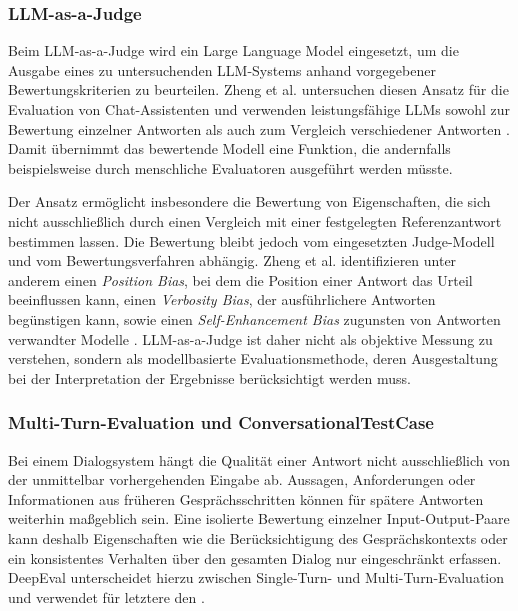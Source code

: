 \subsubsection{LLM-as-a-Judge}
\label{subsubsec:llm_judge}
 
Beim LLM-as-a-Judge wird ein Large Language Model eingesetzt, um die Ausgabe eines zu untersuchenden LLM-Systems anhand vorgegebener Bewertungskriterien zu beurteilen. Zheng et al. untersuchen diesen Ansatz für die Evaluation von Chat-Assistenten und verwenden leistungsfähige LLMs sowohl zur Bewertung einzelner Antworten als auch zum Vergleich verschiedener Antworten \cite{Zheng2023LLMJudge}. Damit übernimmt das bewertende Modell eine Funktion, die andernfalls beispielsweise durch menschliche Evaluatoren ausgeführt werden müsste.
 
Der Ansatz ermöglicht insbesondere die Bewertung von Eigenschaften, die sich nicht ausschließlich durch einen Vergleich mit einer festgelegten Referenzantwort bestimmen lassen. Die Bewertung bleibt jedoch vom eingesetzten Judge-Modell und vom Bewertungsverfahren abhängig. Zheng et al. identifizieren unter anderem einen \textit{Position Bias}, bei dem die Position einer Antwort das Urteil beeinflussen kann, einen \textit{Verbosity Bias}, der ausführlichere Antworten begünstigen kann, sowie einen \textit{Self-Enhancement Bias} zugunsten von Antworten verwandter Modelle \cite{Zheng2023LLMJudge}. LLM-as-a-Judge ist daher nicht als objektive Messung zu verstehen, sondern als modellbasierte Evaluationsmethode, deren Ausgestaltung bei der Interpretation der Ergebnisse berücksichtigt werden muss.
 
\subsubsection{Multi-Turn-Evaluation und ConversationalTestCase}
\label{subsubsec:conversational_testcase}
 
Bei einem Dialogsystem hängt die Qualität einer Antwort nicht ausschließlich von der unmittelbar vorhergehenden Eingabe ab. Aussagen, Anforderungen oder Informationen aus früheren Gesprächsschritten können für spätere Antworten weiterhin maßgeblich sein. Eine isolierte Bewertung einzelner Input-Output-Paare kann deshalb Eigenschaften wie die Berücksichtigung des Gesprächskontexts oder ein konsistentes Verhalten über den gesamten Dialog nur eingeschränkt erfassen. DeepEval unterscheidet hierzu zwischen Single-Turn- und Multi-Turn-Evaluation und verwendet für letztere den \texttt{} \cite{DeepEvalConversationalTestCase}.
 
